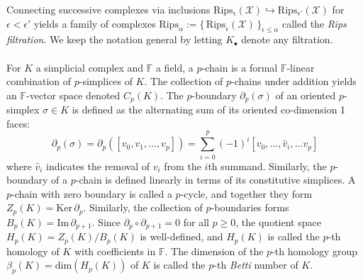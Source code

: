 \documentclass[10pt]{article}
\begin{document}
\noindent Connecting successive complexes via inclusions $\mathrm{Rips_{\epsilon}}(\mathcal{X}) \hookrightarrow \mathrm{Rips_{\epsilon'}}(\mathcal{X})$ for $\epsilon < \epsilon'$ yields a family of complexes $\mathrm{Rips}_{\alpha} := \{ \, \mathrm{Rips}_\epsilon(\mathcal{X}) \, \}_{\epsilon \leq \alpha}$ called the \emph{Rips filtration}. 
We keep the notation general by letting $K_\bullet$ denote any filtration. 
\\
\\
For $K$ a simplicial complex and $\mathbb{F}$ a field, a $p$-chain is a formal $\mathbb{F}$-linear combination of $p$-simplices of $K$. The collection of $p$-chains under addition yields an $\mathbb{F}$-vector space denoted $C_p(K)$. 
The $p$-boundary $\partial_p(\sigma)$ of an oriented $p$-simplex $\sigma\in K$ is defined as the alternating sum of its oriented co-dimension 1 faces:
\begin{equation}\label{eq:alt_sum}
	\partial_p(\sigma) = \partial_p([v_0, v_1, \dots, v_p]) = \sum_{i=0}^p (-1)^i [v_0, \dots, \hat{v}_i, \dots v_p]
\end{equation}
where $\hat{v}_i$ indicates the removal of $v_i$ from the $i$th summand. Similarly, the $p$-boundary of a $p$-chain is defined linearly in terms of its constitutive simplices. 
A $p$-chain with zero boundary is called a $p$-cycle, and together they form $Z_p(K) = \mathrm{Ker}\,\partial_p$. Similarly, the collection of $p$-boundaries forms  $B_p(K) = \mathrm{Im}\,\partial_{p+1}$. Since $\partial_p \circ \partial_{p+1} = 0$ for all $p\geq 0$, the quotient space $H_p(K) = Z_p(K) / B_{p}(K)$ is well-defined, and $H_p(K)$ is called the $p$-th homology of $K$ with coefficients in $\mathbb{F}$. The dimension of the $p$-th homology group $\beta_p(K) = \mathrm{dim}(H_p(K))$ of $K$ is called the $p$-th \emph{Betti} number of $K$. 
\end{document}
